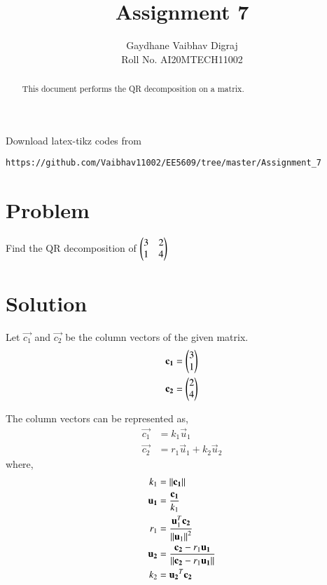\documentclass[journal,12pt,twocolumn]{IEEEtran}
\begin{document}
     \def\rightbox#1{\makebox[0in][r]{#1}}
     \def\centbox#1{\makebox[0in]{#1}}
     \def\topbox#1{\raisebox{-\baselineskip}[0in][0in]{#1}}
     \def\midbox#1{\raisebox{-0.5\baselineskip}[0in][0in]{#1}}
\vspace{3cm}
\title{Assignment 7}
\author{Gaydhane Vaibhav Digraj \\ Roll No. AI20MTECH11002}
\maketitle
\newpage
\bigskip
\renewcommand{\thefigure}{\theenumi}
\renewcommand{\thetable}{\theenumi}
\begin{abstract}
This document performs the QR decomposition on a matrix. 
\end{abstract}
%
Download latex-tikz codes from 
%
\begin{lstlisting}
https://github.com/Vaibhav11002/EE5609/tree/master/Assignment_7
\end{lstlisting}
%
\section{Problem}
Find the QR decomposition of $\begin{pmatrix}3&2\\1&4\end{pmatrix}$ 

\section{Solution}

Let $\vec{c_1}$ and $\vec{c_2}$ be the column vectors of the given matrix.
\begin{align}
    \mathbf{c_1} &= \begin{pmatrix}3\\1\end{pmatrix} \label{eq:1}\\
    \mathbf{c_2} &= \begin{pmatrix}2\\4\end{pmatrix} \label{eq:2} 
\end{align}

The column vectors can be represented as,
\begin{align}
\vec{c_1} &=k_1\vec{u}_1 \label{eq:3}\\
\vec{c_2} &=r_1\vec{u}_1+k_2\vec{u}_2 \label{eq:4}
\end{align}
where, 
\begin{align}
k_1 &= \left\lVert\mathbf{c_1}\right\rVert\label{eq:5}\\
\mathbf{u_1} &= \frac{\mathbf{c_1}}{k_1} \label{eq:6}\\
r_1 &= \frac{\mathbf{u}_1^T\mathbf{c_2}}{\left\lVert\mathbf{u}_1\right\rVert^2} \label{eq:7}\\
\mathbf{u_2} &= \frac{\mathbf{c_2} - r_1 \mathbf{u_1}}{\left\lVert\mathbf{c_2} - r_1 \mathbf{u_1}\right\rVert} \label{eq:8}\\
k_2 &= {\mathbf{u_2}^T\mathbf{c_2}}\label{eq:9}
\end{align}
\end{document}
